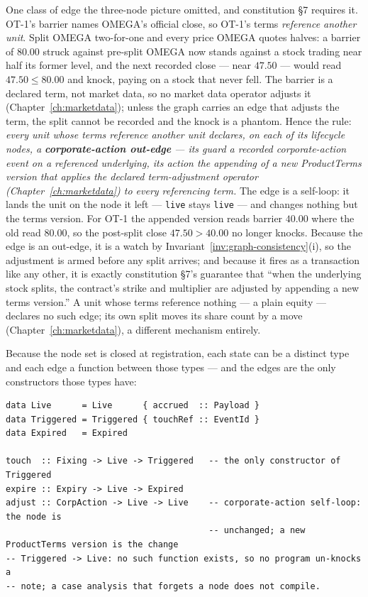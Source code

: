 One class of edge the three-node picture omitted, and constitution \S 7 requires it. OT-1's
barrier names OMEGA's official close, so OT-1's terms \emph{reference another unit}. Split
OMEGA two-for-one and every price OMEGA quotes halves: a barrier of $80.00$ struck against
pre-split OMEGA now stands against a stock trading near half its former level, and the next
recorded close --- near $47.50$ --- would read $47.50 \le 80.00$ and knock, paying
 on a stock that never fell. The barrier is a declared term, not market
data, so no market data operator adjusts it (Chapter~\ref{ch:marketdata}); unless the graph
carries an edge that adjusts the term, the split cannot be recorded and the knock is a
phantom. Hence the rule: \emph{every unit whose terms reference another unit declares, on
each of its lifecycle nodes, a \textbf{corporate-action out-edge} --- its guard a recorded
corporate-action event on a referenced underlying, its action the appending of a new
ProductTerms version that applies the declared term-adjustment operator
(Chapter~\ref{ch:marketdata}) to every referencing term.} The edge is a self-loop: it lands
the unit on the node it left --- \texttt{live} stays \texttt{live} --- and changes nothing
but the terms version. For OT-1 the appended version reads barrier $40.00$ where the old read
$80.00$, so the post-split close $47.50 > 40.00$ no longer knocks. Because the edge is an
out-edge, it is a watch by Invariant~\ref{inv:graph-consistency}(i), so the adjustment is
armed before any split arrives; and because it fires as a transaction like any other, it is
exactly constitution \S 7's guarantee that ``when the underlying stock splits, the contract's
strike and multiplier are adjusted by appending a new terms version.'' A unit whose terms
reference nothing --- a plain equity --- declares no such edge; its own split moves its share
count by a move (Chapter~\ref{ch:marketdata}), a different mechanism entirely.

Because the node set is closed at registration, each state can be a distinct type and
each edge a function between those types --- and the edges are the only constructors
those types have:

\begin{lstlisting}
data Live      = Live      { accrued  :: Payload }
data Triggered = Triggered { touchRef :: EventId }
data Expired   = Expired

touch  :: Fixing -> Live -> Triggered   -- the only constructor of Triggered
expire :: Expiry -> Live -> Expired
adjust :: CorpAction -> Live -> Live    -- corporate-action self-loop: the node is
                                        -- unchanged; a new ProductTerms version is the change
-- Triggered -> Live: no such function exists, so no program un-knocks a
-- note; a case analysis that forgets a node does not compile.
\end{lstlisting}

